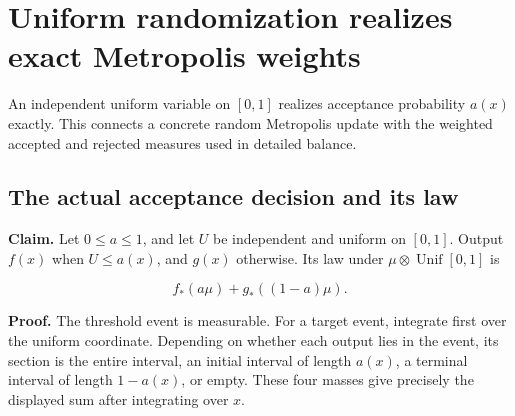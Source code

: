 \documentclass[11pt,a4paper]{report}
\begin{document}
\section{\texorpdfstring{Uniform randomization realizes exact Metropolis weights}{Uniform randomization realizes exact Metropolis weights}}
\label{proof-module-WassersteinMixing-UniformDecision-lean}


An independent uniform variable on \([0,1]\) realizes acceptance probability \(a(x)\) exactly. This connects a concrete random Metropolis update with the weighted accepted and rejected measures used in detailed balance.

\subsection{\texorpdfstring{The actual acceptance decision and its law}{The actual acceptance decision and its law}}
\label{report-step-WassersteinMixing-UniformDecision-lean-1}


\textbf{Claim.} Let \(0\le a\le1\), and let \(U\) be independent and uniform on \([0,1]\). Output \(f(x)\) when \(U\le a(x)\), and \(g(x)\) otherwise. Its law under \(\mu\otimes\operatorname{Unif}[0,1]\) is

\[f_*(a\mu)+g_*((1-a)\mu).\]

\textbf{Proof.} The threshold event is measurable. For a target event, integrate first over the uniform coordinate. Depending on whether each output lies in the event, its section is the entire interval, an initial interval of length \(a(x)\), a terminal interval of length \(1-a(x)\), or empty. These four masses give precisely the displayed sum after integrating over \(x\).
\end{document}
